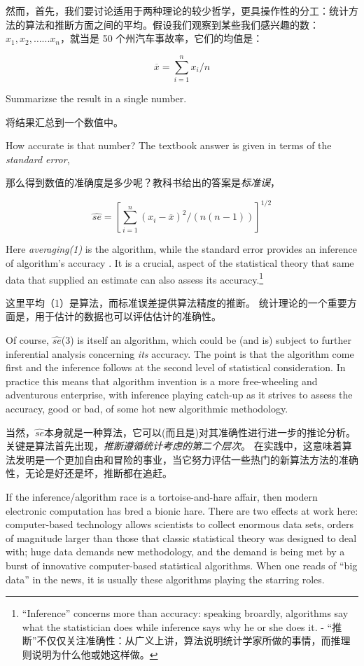 \documentclass[]{ctexbook}
\theoremstyle{definition}
\theoremstyle{definition}
\theoremstyle{definition}
\theoremstyle{remark}
\begin{document}
然而，首先，我们要讨论适用于两种理论的较少哲学，更具操作性的分工：统计方法的算法和推断方面之间的平均。假设我们观察到某些我们感兴趣的数：
\(x _ { 1 } , x _ { 2 } , \dots . . . x _ { n }\)，就当是 50
个州汽车事故率，它们的均值是：

\[
\overline { x } = \sum _ { i = 1 } ^ { n } x _ { i } / n
\]

Summarizse the result in a single number.

将结果汇总到一个数值中。

How accurate is that number? The textbook answer is given in terms of
the \emph{standard error},

那么得到数值的准确度是多少呢？教科书给出的答案是\emph{标准误}，

\[
\hat { s e } = \left[ \sum _ { i = 1 } ^ { n } \left( x _ { i } - \overline { x } \right) ^ { 2 } / ( n ( n - 1 ) ) \right] ^ { 1 / 2 }
\]

Here \emph{averaging(1)} is the algorithm, while the standard error
provides an inference of algorithm's accuracy . It is a crucial, aspect
of the statistical theory that same data that supplied an estimate can
also assess its accuracy.\footnote{``Inference'' concerns more than
  accuracy: speaking broardly, algorithms say what the statistician does
  while inference says why he or she does it. -
  ``推断''不仅仅关注准确性：从广义上讲，算法说明统计学家所做的事情，而推理则说明为什么他或她这样做。}

这里平均（1）是算法，而标准误差提供算法精度的推断。
统计理论的一个重要方面是，用于估计的数据也可以评估估计的准确性。

Of course, \(\hat{se}\)(3) is itself an algorithm, which could be (and
is) subject to further inferential analysis concerning \emph{its}
accuracy. The point is that the algorithm come first and the inference
follows at the second level of statistical consideration. In practice
this means that algorithm invention is a more free-wheeling and
adventurous enterprise, with inference playing catch-up as it strives to
assess the accuracy, good or bad, of some hot new algorithmic
methodology.

当然，\(\hat{se}\)本身就是一种算法，它可以(而且是)对其准确性进行进一步的推论分析。
关键是算法首先出现，\emph{推断遵循统计考虑的第二个层次}。
在实践中，这意味着算法发明是一个更加自由和冒险的事业，当它努力评估一些热门的新算法方法的准确性，无论是好还是坏，推断都在追赶。

If the inference/algorithm race is a tortoise-and-hare affair, then
modern electronic computation has bred a bionic hare. There are two
effects at work here: computer-based technology allows scientists to
collect enormous data sets, orders of magnitude larger than those that
classic statistical theory was designed to deal with; huge data demands
new methodology, and the demand is being met by a burst of innovative
computer-based statistical algorithms. When one reads of ``big data'' in
the news, it is usually these algorithms playing the starring roles.
\end{document}
